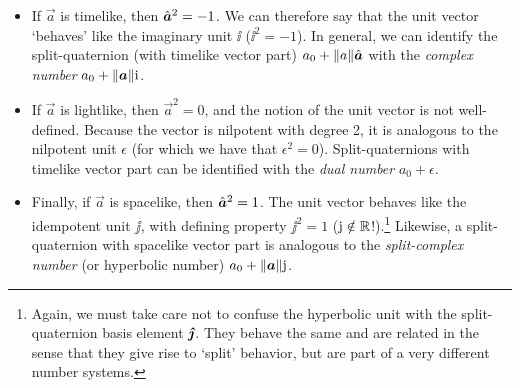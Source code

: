 \begin{itemize}
    \item If \(\vec{a}\) is timelike, then \(\uvec{a}^2 = -1\). We can therefore say that the unit vector `behaves' like the imaginary unit \(\ii\) (\(\ii^2 = -1\)). In general, we can identify the split-quaternion (with timelike vector part) \( a_0 + \norm{a}\uvec{a}\) with the \emph{complex number} \(a_0 + \norm{\vec{a}}\ii\). 
    \item If \(\vec{a}\) is lightlike, then \(\vec{a}^2 = 0\), and the notion of the unit vector is not well-defined. Because the vector is nilpotent with degree 2, it is analogous to the nilpotent unit \(\epsilon\) (for which we have that \(\epsilon^2 = 0\)). Split-quaternions with timelike vector part can be identified with the \emph{dual number} \(a_0 + \epsilon\). 
    \item Finally, if \(\vec{a}\) is spacelike, then \(\uvec{a}^2 = 1\). The unit vector behaves like the idempotent unit \(\jj\), with defining property \(\jj^2 = 1\) (\(\mathrm{j} \notin \mathbb{R}\)!).\footnote
        {Again, we must take care not to confuse the hyperbolic unit with the split-quaternion basis element \(\quatj\). They behave the same and are related in the sense that they give rise to `split' behavior, but are part of a very different number systems.}
        Likewise, a split-quaternion with spacelike vector part is analogous to the \emph{split-complex number} (or hyperbolic number) \(a_0 + \norm{\vec{a}}\jj\).
\end{itemize}

